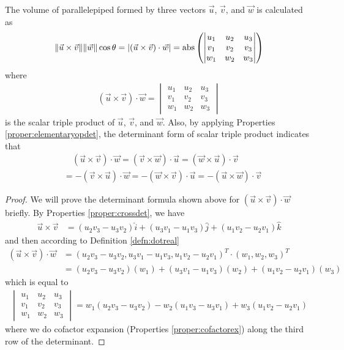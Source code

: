 \begin{proper}
\label{proper:parallelpiped}
The volume of parallelepiped formed by three vectors $\vec{u}$, $\vec{v}$, and $\vec{w}$ is calculated as
\begin{align}
\norm{\vec{u} \times \vec{v}} \norm{\vec{w}} \cos\theta = |(\vec{u} \times \vec{v}) \cdot \vec{w}| =
\text{abs}\left(
\begin{vmatrix}
u_1 & u_2 & u_3 \\
v_1 & v_2 & v_3 \\
w_1 & w_2 & w_3
\end{vmatrix}\right) \label{eqn:scalartriple}
\end{align}
where
\begin{align}
(\vec{u} \times \vec{v}) \cdot \vec{w} =
\begin{vmatrix}
u_1 & u_2 & u_3 \\
v_1 & v_2 & v_3 \\
w_1 & w_2 & w_3
\end{vmatrix}    
\end{align}
is the scalar triple product of $\vec{u}$, $\vec{v}$, and $\vec{w}$. Also, by applying Properties \ref{proper:elementaryopdet}, the determinant form of scalar triple product indicates that
\begin{align}
&\quad (\vec{u} \times \vec{v}) \cdot \vec{w} = (\vec{v} \times \vec{w}) \cdot \vec{u} = (\vec{w} \times \vec{u}) \cdot \vec{v} \nonumber \\
&= -(\vec{v} \times \vec{u}) \cdot \vec{w} = -(\vec{w} \times \vec{v}) \cdot \vec{u} = -(\vec{u} \times \vec{w}) \cdot \vec{v}
\end{align}
\end{proper}
\begin{proof}
We will prove the determinant formula shown above for $(\vec{u} \times \vec{v}) \cdot \vec{w}$ briefly. By Properties \ref{proper:crossdet}, we have
\begin{align*}
\vec{u} \times \vec{v} &= (u_2v_3 - u_3v_2)\hat{i} + (u_3v_1 - u_1v_3)\hat{j} + (u_1v_2 - u_2v_1)\hat{k}     
\end{align*}
and then according to Definition \ref{defn:dotreal}
\begin{align*}
(\vec{u} \times \vec{v}) \cdot \vec{w} &= (u_2v_3 - u_3v_2, u_3v_1 - u_1v_3, u_1v_2 - u_2v_1)^T \cdot (w_1, w_2, w_3)^T \\ 
&= (u_2v_3 - u_3v_2)(w_1) + (u_3v_1 - u_1v_3)(w_2) + (u_1v_2 - u_2v_1)(w_3) 
\end{align*}
which is equal to
\begin{align*}
\begin{vmatrix}
u_1 & u_2 & u_3 \\
v_1 & v_2 & v_3 \\
w_1 & w_2 & w_3
\end{vmatrix}
= w_1(u_2v_3 - u_3v_2) - w_2(u_1v_3 - u_3v_1) + w_3(u_1v_2 - u_2v_1) 
\end{align*}
where we do cofactor expansion (Properties \ref{proper:cofactorex}) along the third row of the determinant.
\end{proof}
